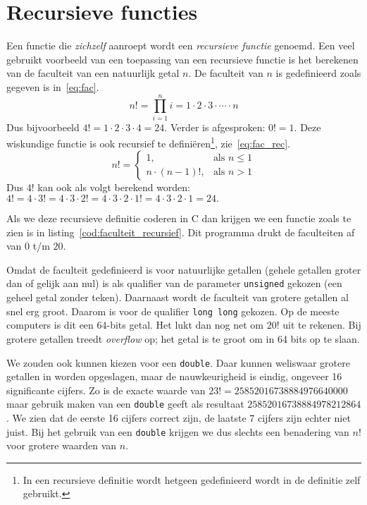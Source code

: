\section{Recursieve functies}
Een functie die \textsl{zichzelf} aanroept wordt een \textsl{recursieve functie} genoemd.
Een veel gebruikt voorbeeld van een toepassing van een recursieve functie is het berekenen van de faculteit van een natuurlijk getal $n$.
De faculteit van $n$ is gedefinieerd zoals gegeven is in~\eqref{eq:fac}.
\begin{equation}
\label{eq:fac}
	n! = \prod_{i=1}^{n} i = 1 \cdot{} 2 \cdot{} 3 \cdot{} \cdots{} \cdot{} n
\end{equation} 
Dus bijvoorbeeld $4! = 1 \cdot{} 2 \cdot{} 3 \cdot 4 = 24$.
Verder is afgesproken: $0! = 1$.
Deze wiskundige functie is ook recursief te definiëren\footnote{%
	In een recursieve definitie wordt hetgeen gedefinieerd wordt in de definitie zelf gebruikt.
}, zie~\eqref{eq:fac_rec}.
\begin{equation}
\label{eq:fac_rec}
	n! =
	\begin{cases}
		1, & \text{als $n \leq 1$}\\
		n \cdot{} (n - 1)!, & \text{als $n > 1$}
	\end{cases}
\end{equation} 
Dus $4!$ kan ook als volgt berekend worden: $4! = 4 \cdot{} 3! = 4 \cdot{} 3 \cdot{} 2! = 4 \cdot{} 3 \cdot{} 2 \cdot 1! = 4 \cdot{} 3 \cdot{} 2 \cdot 1 = 24.$

Als we deze recursieve definitie coderen in C dan krijgen we een functie zoals te zien is in listing~\ref{cod:faculteit_recursief}. Dit programma drukt de faculteiten af van $0$ t/m $20$.


Omdat de faculteit gedefinieerd is voor natuurlijke getallen (gehele getallen groter dan of gelijk aan nul) is als qualifier van de parameter \texttt{unsigned} gekozen (een geheel getal zonder teken). Daarnaast wordt de faculteit van grotere getallen al snel erg groot. Daarom is voor de qualifier \texttt{long long} gekozen. Op de meeste computers is dit een 64-bits getal. Het lukt dan nog net om $20!$ uit te rekenen. Bij grotere getallen treedt \textsl{overflow} op; het getal is te groot om in 64 bits op te slaan.

We zouden ook kunnen kiezen voor een \texttt{double}. Daar kunnen weliswaar grotere getallen in worden opgeslagen, maar de nauwkeurigheid is eindig, ongeveer 16 significante cijfers.
Zo is de exacte waarde van $23! = 25852016738884976640000$ maar gebruik maken van een \texttt{double} geeft als resultaat $25852016738884978212864$. We zien dat de eerste 16 cijfers correct zijn, de laatste 7 cijfers zijn echter niet juist. Bij het gebruik van een \texttt{double} krijgen we dus slechts een benadering van $n!$ voor grotere waarden van $n$.  

